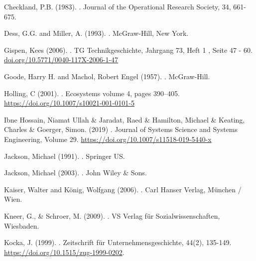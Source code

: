 \documentclass[a4paper,12pt]{scrartcl}
\begin{document}
\begin{thebibliography}{xxx}
 Checkland, P.B. (1983).
.
\newblock Journal of the Operational Research Society, 34, 661-675.

  Dess, G.G. and Miller, A. (1993).
.
\newblock McGraw-Hill, New York.

  Gispen, Kees (2006).
.
\newblock TG Technikgeschichte, Jahrgang 73, Heft 1 , Seite 47 - 60.
\newblock \url{doi.org/10.5771/0040-117X-2006-1-47}

 Goode, Harry H.  and Machol, Robert Engel  (1957).
.
\newblock McGraw-Hill.

  Holling, C (2001).
.
\newblock Ecosystems volume 4, pages 390–405.
\newblock \url{https://doi.org/10.1007/s10021-001-0101-5}

  Ibne Hossain, Niamat Ullah \& Jaradat, Raed \& Hamilton, Michael \& Keating, Charles \& Goerger, Simon. (2019)
.
\newblock  Journal of Systems Science and Systems Engineering, Volume 29.
\newblock \url{https://doi.org/10.1007/s11518-019-5440-x}

  Jackson, Michael (1991).
.
\newblock Springer US.

  Jackson, Michael (2003).
.
\newblock John Wiley \& Sons.

  Kaiser, Walter and König, Wolfgang  (2006).
.
\newblock Carl Hanser Verlag, München / Wien.

  Kneer, G., \& Schroer, M. (2009).
.
\newblock VS Verlag für Sozialwissenschaften, Wiesbaden.

  Kocka, J. (1999).
.
\newblock Zeitschrift für Unternehmensgeschichte, 44(2), 135-149.
\newblock \url{https://doi.org/10.1515/zug-1999-0202}.


\end{thebibliography}
\end{document}
